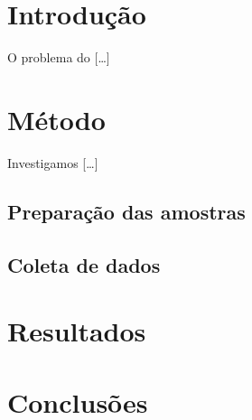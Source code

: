 \documentclass{article}
\begin{document}
\section{Introdução}

O problema do [\ldots]

\section{Método}

Investigamos [\ldots]

\subsection{Preparação das amostras}

\subsection{Coleta de dados}

\section{Resultados}

\section{Conclusões}
\end{document}
